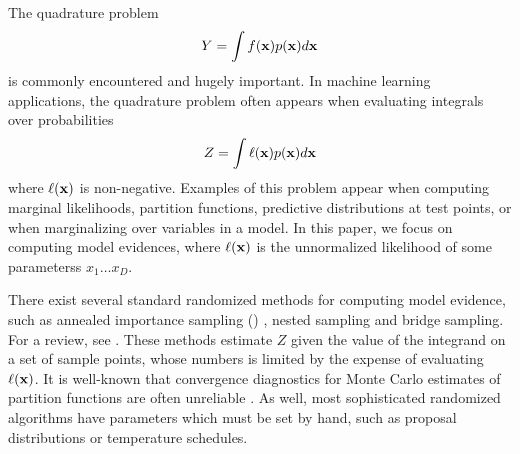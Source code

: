 \documentclass{article}
\begin{document}
The quadrature problem 
\begin{equation}\label{eq:Y}
Y = \int f(\vlfv) p(\vlfv) d\vlfv
\end{equation}
is commonly encountered and hugely important.  In machine learning applications, the quadrature problem often appears when evaluating integrals over probabilities
\begin{equation}
Z = \int \ell(\vlfv) p(\vlfv) d\vlfv
\end{equation}
where $\ell(\vlfv)$ is non-negative.  Examples of this problem appear when computing marginal likelihoods, partition functions, predictive distributions at test points, or when marginalizing over variables in a model.  In this paper, we focus on computing model evidences, where $\ell(\vlfv)$ is the unnormalized likelihood of some parameterss $x_1 \dots x_D$.


There exist several standard randomized methods for computing model evidence, such as annealed importance sampling () \citep{neal2001annealed}, nested sampling \citep{skilling2004nested} and bridge sampling.  For a review, see \citet{chen2000monte}.   These methods estimate $Z$ given the value of the integrand on a set of sample points, whose numbers is limited by the expense of evaluating $\ell(\vlfv)$.  It is well-known that convergence diagnostics for Monte Carlo estimates of partition functions are often unreliable \citep{NealMC, brooks1998convergence, cowles1999possible}.  As well, most sophisticated randomized algorithms have parameters which must be set by hand, such as proposal distributions or temperature schedules.

\end{document}
